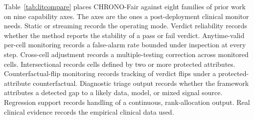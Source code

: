 \documentclass[acmsmall,nonacm,review,anonymous]{acmart}
\newcommand{\1}[1]{\mathbf{1}\!\left\{#1\right\}}
\begin{document}
Table~\ref{tab:litcompare} places CHRONO-Fair against eight families of prior work on nine capability axes. The axes are the ones a post-deployment clinical monitor needs. Static or streaming records the operating mode. Verdict reliability records whether the method reports the stability of a pass or fail verdict. Anytime-valid per-cell monitoring records a false-alarm rate bounded under inspection at every step. Cross-cell adjustment records a multiple-testing correction across monitored cells. Intersectional records cells defined by two or more protected attributes. Counterfactual-flip monitoring records tracking of verdict flips under a protected-attribute counterfactual. Diagnostic triage output records whether the framework attributes a detected gap to a likely data, model, or mixed signal source. Regression support records handling of a continuous, rank-allocation output. Real clinical evidence records the empirical clinical data used.
\end{document}
